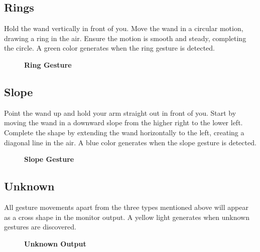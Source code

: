 \subsection{Rings}
Hold the wand vertically in front of you. Move the wand in a circular motion, drawing a ring in the air. Ensure the motion is smooth and steady, completing the circle. A green color generates when the ring gesture is detected.

\begin{figure}[h]
	\centering
	\caption{\textbf{Ring Gesture}}
	\label{fig:Ring_Gesture}
\end{figure}

\subsection{Slope}
Point the wand up and hold your arm straight out in front of you. Start by moving the wand in a downward slope from the higher right to the lower left. Complete the shape by extending the wand horizontally to the left, creating a diagonal line in the air. A blue color generates when the slope gesture is detected.

\begin{figure}[h]
	\centering
	\caption{\textbf{Slope Gesture}}
	\label{fig:Slope_Gesture}
\end{figure}

\subsection{Unknown}

All gesture movements apart from the three types mentioned above will appear as a cross shape in the monitor output. A yellow light generates when unknown gestures are discovered.

\begin{figure}[h]
	\centering
	\caption{\textbf{Unknown Output}}
	\label{fig:Unknown_Gesture}
\end{figure}



